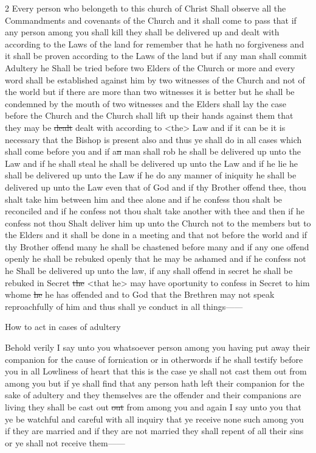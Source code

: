 				2 Every person who belongeth to this church of Christ Shall observe all the Commandments and covenants of the Church and it shall come to pass that if any person among you shall kill they shall be delivered up and dealt with according to the Laws of the land for remember that he hath no forgiveness and it shall be proven according to the Laws of the land but if any man shall commit Adultery he Shall be tried before two Elders of the Church or more and every word shall be established against him by two witnesses of the Church and not of the world but if there are more than two witnesses it is better but he shall be condemned by the mouth of two witnesses and the Elders shall lay the case before the Church and the Church shall lift up their hands against them that they may be \sout{dealt} dealt with according to <the> Law and if it can be it is necessary that the Bishop is present also and thus ye shall do in all cases which shall come before you and if a\sout{n} man shall rob he shall be delivered up unto the Law and if he shall steal he shall be delivered up unto the Law and if he lie he shall be delivered up unto the Law if he do any manner of iniquity he shall be delivered up unto the Law even that of God and if thy Brother offend thee, thou shalt take him between him and thee alone and if he confess thou shalt be reconciled and if he confess not thou shalt take another with thee and then if he confess not thou Shalt deliver him up unto the Church not to the members but to the Elders and it shall be done in a meeting and that not before the world and if thy Brother offend many he shall be chastened before many and if any one offend openly he shall be rebuked openly that he may be ashamed and if he confess not he Shall be delivered up unto the law, if any shall offend in secret he shall be rebuked in Secret \sout{the} <that he> may have oportunity to confess in Secret to him whome \sout{he} he has offended and to God that the Brethren may not speak reproachfully of him and thus shall ye conduct in all things------
				
				\begin{tightcenter}
				How to act in cases of adultery
				\end{tightcenter}
				
				Behold verily I say unto you whatsoever person among you having put away their companion for the cause of fornication or in otherwords if he shall testify before you in all Lowliness of heart that this is the case ye shall not cast them out from among you but if ye shall find that any person hath left their companion for the sake of adultery and they themselves are the offender and their companions are living they shall be cast out \sout{out} from among you and again I say unto you that ye be watchful and careful with all inquiry that ye receive none such among you if they are married and if they are not married they shall repent of all their sins or ye shall not receive them------
				
